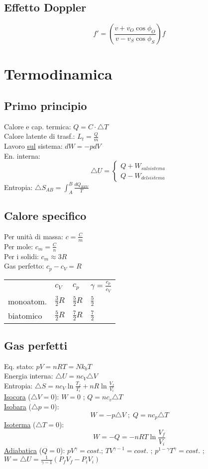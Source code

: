 \documentclass{article}
\begin{document}
\begin{small}
\begin{multicols}{3}
	\subsection{Effetto Doppler}
		\[ f' = \left ( \frac{ v + v_O \cos \phi_O }{ v - v_S \cos \phi_S } \right ) f \]
\section{Termodinamica}
	\subsection{Primo principio}
		Calore e cap. termica: $ Q = C \cdot \triangle T $ \\
		Calore latente di trasf.: $ L_t = \frac{ Q }{ m } $ \\
		Lavoro \underline{sul} sistema: $ d W = - p d V $ \\
		En. interna: \[ \triangle U = \begin{cases} Q + W_{sul sistema} \\ Q - W_{del sistema} \end{cases} \]
		Entropia: $ \triangle S_{AB} = \int_{A}^{B} \frac{ d Q_{REV} }{ T } $
	\subsection{Calore specifico}
		Per unità di massa: $ c = \frac{ C }{ m } $ \\
		Per mole: $ c_m = \frac{ C }{ n } $ \\
		Per i solidi: $ c_m \approx 3 R $ \\
		Gas perfetto: $ c_p - c_V = R $ \\
		\begin{tabular}{l|lll}
			          & $c_V$             & $c_p$             & $\gamma = \frac{ c_p }{ c_V }$ \\
			monoatom. & $\frac{ 3 }{2} R$ & $\frac{ 5 }{2} R$ & $\frac{ 5 }{2}$ \\
			biatomico & $\frac{ 5 }{2} R$ & $\frac{ 7 }{2} R$ & $\frac{ 7 }{2}$
		\end{tabular}
	\subsection{Gas perfetti}
		Eq. stato: $ p V = n R T = N k_b T $ \\
		Energia interna: $ \triangle U = n c_V \triangle V $ \\
		Entropia: $ \triangle S = n c_V \ln \frac{ T_f }{ T_i } + n R \ln \frac{ V_f }{ V_i } $ \\
		\underline{Isocora} ($ \triangle V = 0 $): $ W = 0 $ ; $ Q = n c_v \triangle T $ \\
		\underline{Isobara} ($ \triangle p = 0 $): \[ W = - p \triangle V \;;\; Q = n c_p \triangle T \]
		\underline{Isoterma} ($ \triangle T = 0 $): \[ W = - Q = - n R T \ln \frac{ V_f }{ V_i } \]
		\underline{Adiabatica} ($ Q = 0 $): $ p V^{\gamma} = cost. $; $ T V^{\gamma -1} = cost.$ ; $ p^{1 - \gamma} T^{\gamma} = cost.$ ;
					$ W = \triangle U = \frac{1}{ \gamma -1 } ( P_f V_f - P_i V_i ) $ 

\end{multicols}
\end{small}
\end{document}
